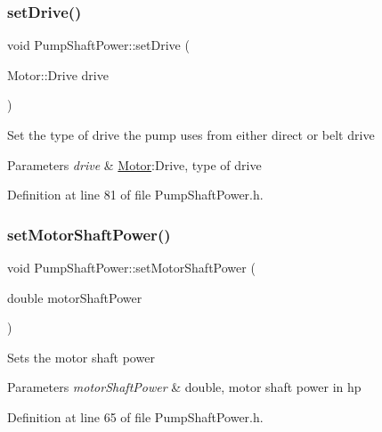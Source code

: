 \subsubsection{\texorpdfstring{set\+Drive()}{setDrive()}\hspace{0.1cm}{\footnotesize\ttfamily [3/3]}}
{\footnotesize\ttfamily void Pump\+Shaft\+Power\+::set\+Drive (\begin{DoxyParamCaption}\item[{Motor\+::\+Drive}]{drive }\end{DoxyParamCaption})\hspace{0.3cm}{\ttfamily [inline]}}

Set the type of drive the pump uses from either direct or belt drive 
\begin{DoxyParams}{Parameters}
{\em drive} & \hyperlink{struct_motor}{Motor}\+:Drive, type of drive \\
\hline
\end{DoxyParams}


Definition at line 81 of file Pump\+Shaft\+Power.\+h.

\mbox{\label{class_pump_shaft_power_a77b8c621c7c92841dbd00112437c413b}} 
\subsubsection{\texorpdfstring{set\+Motor\+Shaft\+Power()}{setMotorShaftPower()}\hspace{0.1cm}{\footnotesize\ttfamily [1/3]}}
{\footnotesize\ttfamily void Pump\+Shaft\+Power\+::set\+Motor\+Shaft\+Power (\begin{DoxyParamCaption}\item[{double}]{motor\+Shaft\+Power }\end{DoxyParamCaption})\hspace{0.3cm}{\ttfamily [inline]}}

Sets the motor shaft power 
\begin{DoxyParams}{Parameters}
{\em motor\+Shaft\+Power} & double, motor shaft power in hp \\
\hline
\end{DoxyParams}


Definition at line 65 of file Pump\+Shaft\+Power.\+h.

